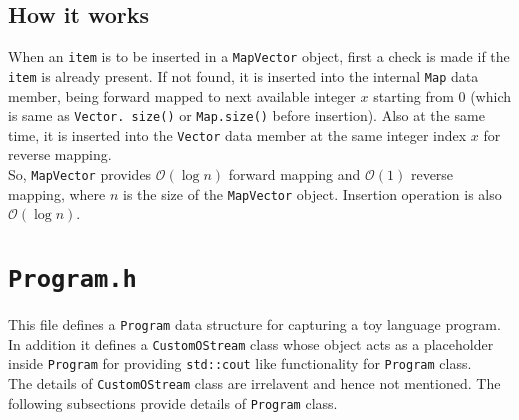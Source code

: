 \subsection{How it works}
\label{subsec:HowItWorks}
When an \texttt{item} is to be inserted in a \texttt{MapVector} object, first 
a check is made if the \texttt{item} is already present. If not found, 
it is inserted into the internal \texttt{Map} data member, being forward mapped 
to next available integer $x$ starting from $0$ (which is same as \texttt{Vector.
size()} or \texttt{Map.size()} before insertion). Also at the same time, it is 
inserted into the \texttt{Vector} data member at the same integer index $x$ for 
reverse mapping.\\
So, \texttt{MapVector} provides $\mathcal{O}(\log{}n)$ forward mapping and 
$\mathcal{O}(1)$ reverse mapping, where $n$ is the size of the 
\texttt{MapVector} object. Insertion operation is also $\mathcal{O}(\log{}n)$.

\section{\texttt{Program.h}}
\label{ProgramH}
This file defines a \texttt{Program} data structure for capturing a toy 
language program. In addition it defines a \texttt{CustomOStream} class whose 
object acts as a placeholder inside \texttt{Program} for providing 
\texttt{std::cout} like functionality for \texttt{Program} class.\\
The details of \texttt{CustomOStream} class are irrelavent and hence not 
mentioned. The following subsections provide details of \texttt{Program} class.

